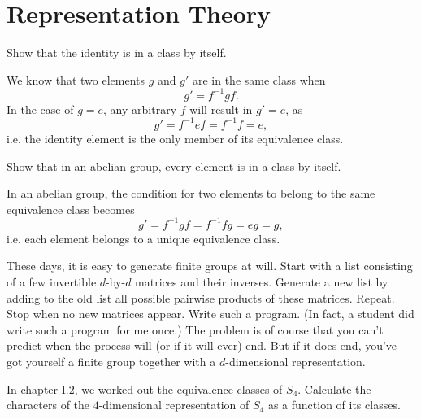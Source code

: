 \documentclass[../group-theory-in-a-nutshell-for-physicists.tex]{subfiles}
\begin{document}
\printanswers

\section{Representation Theory}

\begin{questions}

\question Show that the identity is in a class by itself.

\begin{solution}
	We know that two elements $g$ and $g'$ are in the same class when
	\[
		g' = f^{-1}gf.
	\]
	In the case of $g = e$, any arbitrary $f$ will result in $g' = e$, as 
	\[
		g' = f^{-1}ef = f^{-1}f = e,
	\]
	i.e. the identity element is the only member of its equivalence class.
\end{solution}

\question Show that in an abelian group, every element is in a class by itself.

\begin{solution}
	In an abelian group, the condition for two elements to belong to the same equivalence class becomes
	\[
		g' = f^{-1}gf = f^{-1}fg = eg = g,
	\]
	i.e. each element belongs to a unique equivalence class.
\end{solution}

\question These days, it is easy to generate finite groups at will. Start with a list consisting of a few invertible $d$-by-$d$ matrices and their inverses. Generate a new list by adding to the old list all possible pairwise products of these matrices. Repeat. Stop when no new matrices appear. Write such a program. (In fact, a student did write such a program for me once.) The problem is of course that you can't predict when the process will (or if it will ever) end. But if it does end, you've got yourself a finite group together with a $d$-dimensional representation.

\question In chapter I.2, we worked out the equivalence classes of $S_4$. Calculate the characters of the $4$-dimensional representation of $S_4$ as a function of its classes.


\end{questions}
\end{document}
